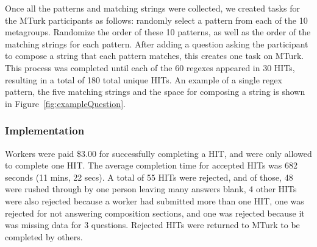Once all the patterns and matching strings were collected, we created tasks for the MTurk participants as follows:
randomly select a pattern from each of the 10 metagroups. Randomize the order of these 10 patterns, as well as the order of the matching strings for each pattern. After adding a question asking the participant to compose a string that each pattern matches, this creates one task on MTurk.   This process was completed until each of the 60 regexes appeared in 30 HITs, resulting in a total of 180 total unique HITs.
An example of a single regex pattern, the five matching strings and the space for composing a string is shown in Figure~\ref{fig:exampleQuestion}.

\subsubsection{Implementation}
Workers were paid \$3.00 for successfully completing a HIT, and were only allowed to complete  one HIT.  The average completion time for accepted HITs was 682 seconds (11 mins, 22 secs).
A total of 55 HITs were rejected, and  of those, 48 were rushed through by one person leaving many answers blank, 4 other HITs were also rejected because a worker had submitted more than one HIT, one was rejected for not answering composition sections, and one was rejected because it was missing data for 3 questions.  Rejected HITs were returned to MTurk to be completed by others.

